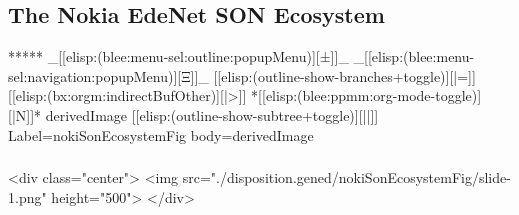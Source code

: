 \begin{whenOrg}
\section{The Nokia EdeNet SON Ecosystem}

\begin{whenOrg}
*****  _[[elisp:(blee:menu-sel:outline:popupMenu)][±]]_ _[[elisp:(blee:menu-sel:navigation:popupMenu)][Ξ]]_ [[elisp:(outline-show-branches+toggle)][|=]] [[elisp:(bx:orgm:indirectBufOther)][|>]] *[[elisp:(blee:ppmm:org-mode-toggle)][|N]]*  derivedImage [[elisp:(outline-show-subtree+toggle)][||]] Label=nokiSonEcosystemFig  body=derivedImage
\end{whenOrg}

\begin{htmlonly}

\begin{frame}[fragile,plain,label=nokiSonEcosystemFig]
    \frametitle{}
    \framesubtitle{}
    \begin{rawhtml}
<div class="center">
<img src="./disposition.gened/nokiSonEcosystemFig/slide-1.png" height="500">
</div>
    \end{rawhtml}
\end{frame}
\end{htmlonly}

\begin{verblatex}

\begin{frame}[fragile,plain,label=nokiSonEcosystemFig]
    \frametitle{}
    \framesubtitle{}

\begin{presentationMode}


\end{presentationMode}
\end{frame}
\end{verblatex}
\end{whenOrg}
